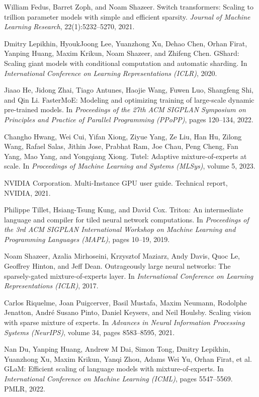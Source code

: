 \documentclass{article}
\begin{document}

\begin{thebibliography}{9}

William Fedus, Barret Zoph, and Noam Shazeer.
\newblock Switch transformers: Scaling to trillion parameter models with simple and efficient sparsity.
\newblock \textit{Journal of Machine Learning Research}, 22(1):5232--5270, 2021.

Dmitry Lepikhin, HyoukJoong Lee, Yuanzhong Xu, Dehao Chen, Orhan Firat, Yanping Huang, Maxim Krikun, Noam Shazeer, and Zhifeng Chen.
\newblock GShard: Scaling giant models with conditional computation and automatic sharding.
\newblock In \textit{International Conference on Learning Representations (ICLR)}, 2020.

Jiaao He, Jidong Zhai, Tiago Antunes, Haojie Wang, Fuwen Luo, Shangfeng Shi, and Qin Li.
\newblock FasterMoE: Modeling and optimizing training of large-scale dynamic pre-trained models.
\newblock In \textit{Proceedings of the 27th ACM SIGPLAN Symposium on Principles and Practice of Parallel Programming (PPoPP)}, pages 120--134, 2022.

Changho Hwang, Wei Cui, Yifan Xiong, Ziyue Yang, Ze Liu, Han Hu, Zilong Wang, Rafael Salas, Jithin Jose, Prabhat Ram, Joe Chau, Peng Cheng, Fan Yang, Mao Yang, and Yongqiang Xiong.
\newblock Tutel: Adaptive mixture-of-experts at scale.
\newblock In \textit{Proceedings of Machine Learning and Systems (MLSys)}, volume 5, 2023.

NVIDIA Corporation.
\newblock Multi-Instance GPU user guide.
\newblock Technical report, NVIDIA, 2021.

Philippe Tillet, Hsiang-Tsung Kung, and David Cox.
\newblock Triton: An intermediate language and compiler for tiled neural network computations.
\newblock In \textit{Proceedings of the 3rd ACM SIGPLAN International Workshop on Machine Learning and Programming Languages (MAPL)}, pages 10--19, 2019.

Noam Shazeer, Azalia Mirhoseini, Krzysztof Maziarz, Andy Davis, Quoc Le, Geoffrey Hinton, and Jeff Dean.
\newblock Outrageously large neural networks: The sparsely-gated mixture-of-experts layer.
\newblock In \textit{International Conference on Learning Representations (ICLR)}, 2017.

Carlos Riquelme, Joan Puigcerver, Basil Mustafa, Maxim Neumann, Rodolphe Jenatton, André Susano Pinto, Daniel Keysers, and Neil Houlsby.
\newblock Scaling vision with sparse mixture of experts.
\newblock In \textit{Advances in Neural Information Processing Systems (NeurIPS)}, volume 34, pages 8583--8595, 2021.

Nan Du, Yanping Huang, Andrew M Dai, Simon Tong, Dmitry Lepikhin, Yuanzhong Xu, Maxim Krikun, Yanqi Zhou, Adams Wei Yu, Orhan Firat, et al.
\newblock GLaM: Efficient scaling of language models with mixture-of-experts.
\newblock In \textit{International Conference on Machine Learning (ICML)}, pages 5547--5569. PMLR, 2022.

\end{thebibliography}
\end{document}
